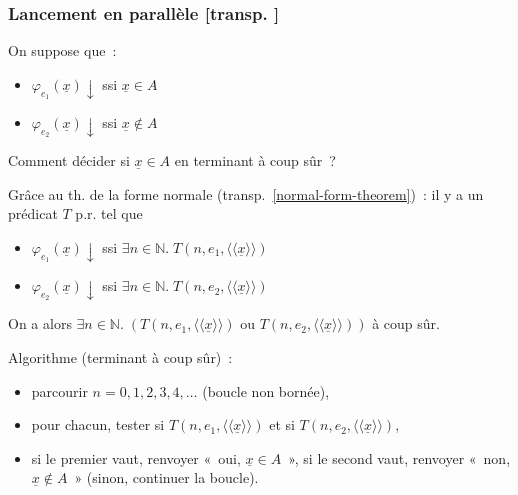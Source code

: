 \documentclass[mathserif,a4paper,aspectratio=169]{beamer}
\newcommand{\dbllangle}{\mathopen{\langle\!\langle}}
\newcommand{\dblrangle}{\mathclose{\rangle\!\rangle}}
\renewcommand{\frametitle}[1]{\subsubsection*{#1 {\footnotesize[transp. \insertframenumber]}}}
\begin{document}
\begin{frame}
\frametitle{Lancement en parallèle}

On suppose que :
\begin{itemize}
\item $\varphi_{e_1}(\underline{x})\downarrow$ ssi $\underline{x} \in A$
\item $\varphi_{e_2}(\underline{x})\downarrow$ ssi $\underline{x} \not\in A$
\end{itemize}
Comment décider si $\underline{x} \in A$ en terminant à coup sûr ?

\bigskip

Grâce au \alert{th. de la forme normale}
(transp. \ref{normal-form-theorem}) : il y a un prédicat $T$ p.r. tel
que
\begin{itemize}
\item $\varphi_{e_1}(\underline{x})\downarrow$ ssi $\exists
  n\in\mathbb{N}.\; T(n,e_1,\dbllangle\underline{x}\dblrangle)$
\item $\varphi_{e_2}(\underline{x})\downarrow$ ssi $\exists
  n\in\mathbb{N}.\; T(n,e_2,\dbllangle\underline{x}\dblrangle)$
\end{itemize}
On a alors $\exists n\in\mathbb{N}.\;
(T(n,e_1,\dbllangle\underline{x}\dblrangle) \text{~ou~}
T(n,e_2,\dbllangle\underline{x}\dblrangle))$ à coup sûr.

\bigskip

Algorithme (terminant à coup sûr) :
\begin{itemize}
\item parcourir $n=0,1,2,3,4,\ldots$ (boucle non bornée),
\item pour chacun, tester si
  $T(n,e_1,\dbllangle\underline{x}\dblrangle)$ et si
  $T(n,e_2,\dbllangle\underline{x}\dblrangle)$,
\item si le premier vaut, renvoyer « oui, $\underline{x}\in A$ », si
  le second vaut, renvoyer « non, $\underline{x}\not\in A$ » (sinon,
  continuer la boucle).
\end{itemize}

\end{frame}
%
\end{document}
